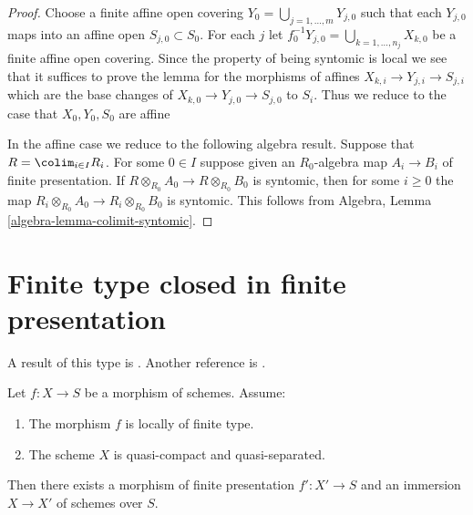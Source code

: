 \begin{proof}
Choose a finite affine open covering
$Y_0 = \bigcup_{j = 1, \ldots, m} Y_{j, 0}$
such that each $Y_{j, 0}$ maps into an affine open
$S_{j, 0} \subset S_0$. For each $j$ let
$f_0^{-1}Y_{j, 0} = \bigcup_{k = 1, \ldots, n_j} X_{k, 0}$ be a
finite affine open covering. Since the property of being syntomic is
local we see that it suffices to prove the lemma for the morphisms
of affines $X_{k, i} \to Y_{j, i} \to S_{j, i}$ which are the base
changes of $X_{k, 0} \to Y_{j, 0} \to S_{j, 0}$ to $S_i$.
Thus we reduce to the case that $X_0, Y_0, S_0$ are affine

\medskip\noindent
In the affine case we reduce to the following algebra result.
Suppose that $R = \colim_{i \in I} R_i$. For some $0 \in I$
suppose given an $R_0$-algebra map $A_i \to B_i$ of finite presentation.
If $R \otimes_{R_0} A_0 \to R \otimes_{R_0} B_0$ is syntomic, then
for some $i \geq 0$ the map
$R_i \otimes_{R_0} A_0 \to R_i \otimes_{R_0} B_0$ is syntomic.
This follows from Algebra,
Lemma \ref{algebra-lemma-colimit-syntomic}.
\end{proof}





\section{Finite type closed in finite presentation}
\label{section-finite-type-closed-in-finite-presentation}

\noindent
A result of this type is \cite[Satz 2.10]{Kiehl}. Another
reference is \cite{Conrad-Nagata}.

\begin{lemma}
\label{lemma-locally-finite-type-in-finite-presentation}
Let $f : X \to S$ be a morphism of schemes.
Assume:
\begin{enumerate}
\item The morphism $f$ is locally of finite type.
\item The scheme $X$ is quasi-compact and quasi-separated.
\end{enumerate}
Then there exists a morphism of finite presentation
$f' : X' \to S$ and an immersion $X \to X'$ of schemes over $S$.
\end{lemma}

